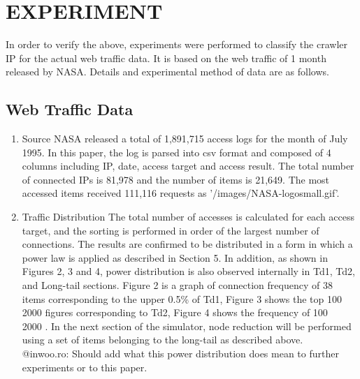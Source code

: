 \documentclass[sigconf,anonymous=false]{acmart}
\begin{document}
%
%
\section{EXPERIMENT}
In order to verify the above, experiments were performed to classify the crawler IP for the actual web traffic data. It is based on the web traffic of 1 month released by NASA. Details and experimental method of data are as follows.


\subsection{Web Traffic Data}


\begin{enumerate}
\item Source
\newline NASA released a total of 1,891,715 access logs for the month of July 1995. In this paper, the log is parsed into csv format and composed of 4 columns including IP, date, access target and access result.
The total number of connected IPs is 81,978 and the number of items is 21,649. The most accessed items received 111,116 requests as '/images/NASA-logosmall.gif'.
\newline
\item Traffic Distribution
\newline 
The total number of accesses is calculated for each access target, and the sorting is performed in order of the largest number of connections. The results are confirmed to be distributed in a form in which a power law is applied as described in Section 5. 
In addition, as shown in Figures 2, 3 and 4, power distribution is also observed internally in Td1, Td2, and Long-tail sections. Figure 2 is a graph of connection frequency of 38 items corresponding to the upper 0.5\% of Td1, Figure 3 shows the top 100 ~ 2000 figures corresponding to Td2, Figure 4 shows the frequency of 100 ~ 2000 . In the next section of the simulator, node reduction will be performed using a set of items belonging to the long-tail as described above. \\
@inwoo.ro: Should add what this power distribution does mean to further experiments or to this paper.
\end{enumerate}
\end{document}
